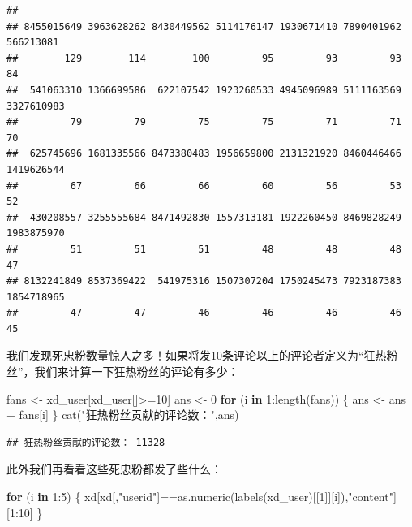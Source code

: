\documentclass[
]{article}
\newenvironment{Shaded}{\begin{snugshade}}{\end{snugshade}}
\newcommand{\ControlFlowTok}[1]{\textcolor[rgb]{0.13,0.29,0.53}{\textbf{#1}}}
\newcommand{\DecValTok}[1]{\textcolor[rgb]{0.00,0.00,0.81}{#1}}
\newcommand{\FunctionTok}[1]{\textcolor[rgb]{0.00,0.00,0.00}{#1}}
\newcommand{\NormalTok}[1]{#1}
\newcommand{\OtherTok}[1]{\textcolor[rgb]{0.56,0.35,0.01}{#1}}
\newcommand{\SpecialCharTok}[1]{\textcolor[rgb]{0.00,0.00,0.00}{#1}}
\newcommand{\StringTok}[1]{\textcolor[rgb]{0.31,0.60,0.02}{#1}}
\begin{document}
\begin{verbatim}
## 
## 8455015649 3963628262 8430449562 5114176147 1930671410 7890401962  566213081 
##        129        114        100         95         93         93         84 
##  541063310 1366699586  622107542 1923260533 4945096989 5111163569 3327610983 
##         79         79         75         75         71         71         70 
##  625745696 1681335566 8473380483 1956659800 2131321920 8460446466 1419626544 
##         67         66         66         60         56         53         52 
##  430208557 3255555684 8471492830 1557313181 1922260450 8469828249 1983875970 
##         51         51         51         48         48         48         47 
## 8132241849 8537369422  541975316 1507307204 1750245473 7923187383 1854718965 
##         47         47         46         46         46         46         45
\end{verbatim}

我们发现死忠粉数量惊人之多！如果将发10条评论以上的评论者定义为``狂热粉丝''，我们来计算一下狂热粉丝的评论有多少：

\begin{Shaded}
\begin{Highlighting}[]
\NormalTok{fans }\OtherTok{\textless{}{-}}\NormalTok{ xd\_user[xd\_user[]}\SpecialCharTok{\textgreater{}=}\DecValTok{10}\NormalTok{]}
\NormalTok{ans }\OtherTok{\textless{}{-}} \DecValTok{0}
\ControlFlowTok{for}\NormalTok{ (i }\ControlFlowTok{in} \DecValTok{1}\SpecialCharTok{:}\FunctionTok{length}\NormalTok{(fans)) \{}
\NormalTok{  ans }\OtherTok{\textless{}{-}}\NormalTok{ ans }\SpecialCharTok{+}\NormalTok{ fans[i]}
\NormalTok{\}}
\FunctionTok{cat}\NormalTok{(}\StringTok{"狂热粉丝贡献的评论数："}\NormalTok{,ans)}
\end{Highlighting}
\end{Shaded}

\begin{verbatim}
## 狂热粉丝贡献的评论数： 11328
\end{verbatim}

此外我们再看看这些死忠粉都发了些什么：

\begin{Shaded}
\begin{Highlighting}[]
\ControlFlowTok{for}\NormalTok{ (i }\ControlFlowTok{in} \DecValTok{1}\SpecialCharTok{:}\DecValTok{5}\NormalTok{) \{}
\NormalTok{  xd[xd[,}\StringTok{"userid"}\NormalTok{]}\SpecialCharTok{==}\FunctionTok{as.numeric}\NormalTok{(}\FunctionTok{labels}\NormalTok{(xd\_user)[[}\DecValTok{1}\NormalTok{]][i]),}\StringTok{"content"}\NormalTok{][}\DecValTok{1}\SpecialCharTok{:}\DecValTok{10}\NormalTok{]}
\NormalTok{\}}
\end{Highlighting}
\end{Shaded}
\end{document}
